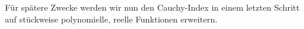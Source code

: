\documentclass{mythesis}
\begin{document}


Für spätere Zwecke werden wir nun den Cauchy-Index in einem letzten Schritt auf stückweise polynomielle, reelle Funktionen erweitern.
\end{document}
